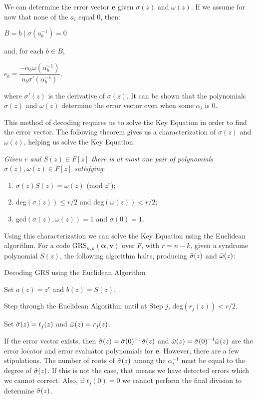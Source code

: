 \documentclass{article}
\begin{document}
We can determine the error vector $\textbf{e}$ given $\sigma(z) \text{ and } \omega(z)$. If we assume for now that none of the $a_{i}$ equal 0, then:
\begin{center}
$B = {b \mid \sigma(a_{b}^{-1}) = 0}$
\end{center}
and, for each $b \in B$,
\begin{center}
$e_{b} = \dfrac{-\alpha_{b}\omega(\alpha_{b}^{-1})}{u_{b}\sigma'(\alpha_{b}^{-1})}$,
\end{center}
where $\sigma'(z)$ is the derivative of $\sigma(z)$. It can be shown that the polynomials $\sigma(z)$ and $\omega(z)$ determine the error vector even when some $\alpha_{i}$ is 0.

This method of decoding requires us to solve the Key Equation in order to find the error vector. The following theorem gives us a characterization of $\sigma(z)$ and $\omega(z)$, helping us solve the Key Equation.

\textit{Given $r$ and $S(z) \in F[z]$ there is at most one pair of polynomials $\sigma(z),\omega(z) \in F[z]$ satisfying}:
\begin{enumerate}
	\item $\sigma(z)S(z) = \omega(z)$ (mod $z^{r}$);
	\item deg$(\sigma(z)) \le r/2$ and deg$(\omega(z)) < r/2$;
	\item gcd$(\sigma(z),\omega(z)) = 1$ and $\sigma(0) = 1$.
\end{enumerate}

Using this characterization we can solve the Key Equation using the Euclidean algorithm. For a code $\text{GRS}_{n,k}(\boldsymbol\alpha, \textbf{v})$ over $F$, with $r = n - k$, given a syndrome polynomial $S(z)$, the following algorithm halts, producing $\Tilde{\sigma}(z)$ and $\Tilde{\omega}(z)$:
\begin{algorithm}[H]
	\caption{Decoding GRS using the Euclidean Algorithm\label{decoding}}
	Set $a(z) = z^{r}$ and $b(z) = S(z)$.
	
	Step through the Euclidean Algorithm until at Step $j$, deg$(r_{j}(z)) < r/2$.
	
	Set $\Tilde{\sigma}(z) = t_{j}(z)$ and $\Tilde{\omega}(z) = r_{j}(z)$.
\end{algorithm}
If the error vector exists, then $\Hat{\sigma}(z) = \Tilde{\sigma}(0)^{-1}\Tilde{\sigma}(z)$ and $\Hat{\omega}(z) = \Tilde{\sigma}(0)^{-1}\Tilde{\omega}(z)$ are the error locator and error evaluator polynomials for $\textbf{e}$. However, there are a few stipulations. The number of roots of $\Hat{\sigma}(z)$ among the $\alpha_{i}^{-1}$ must be equal to the degree of $\Hat{\sigma}(z)$. If this is not the case, that means we have detected errors which we cannot correct. Also, if $t_{j}(0) = 0$ we cannot perform the final division to determine $\Hat{\sigma}(z)$.
\end{document}

